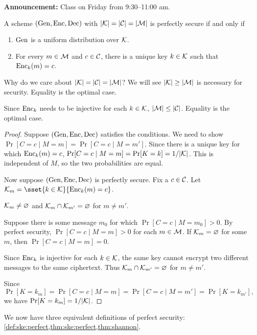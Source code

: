 \textbf{Announcement:} Class on Friday from 9:30--11:00 am.

\begin{theorem*} \label{thm:shannon}
    A scheme $(\operatorname{Gen}, \operatorname{Enc}, \operatorname{Dec})$ with
    $\lvert\mathcal{K}\rvert = \lvert\mathcal{C}\rvert = \lvert\mathcal{M}\rvert$ is perfectly secure
    if and only if
    \begin{enumerate}
        \item $\operatorname{Gen}$ is a uniform distribution over $\mathcal{K}$.
        \item For every $m \in \mathcal{M}$ and $c \in \mathcal{C}$,
            there is a unique key $k \in \mathcal{K}$ such that
            $\operatorname{Enc}_k(m) = c$.
    \end{enumerate}
\end{theorem*}
Why do we care about $\lvert\mathcal{K}\rvert = \lvert\mathcal{C}\rvert = \lvert\mathcal{M}\rvert$?
We will see $\lvert\mathcal{K}\rvert \ge \lvert\mathcal{M}\rvert$ is necessary for security.
Equality is the optimal case.

Since $\operatorname{Enc}_k$ needs to be injective for each $k \in \mathcal{K}$,
$\lvert\mathcal{M}\rvert \le \lvert\mathcal{C}\rvert$.
Equality is the optimal case.

\begin{proof}
    Suppose $(\operatorname{Gen}, \operatorname{Enc}, \operatorname{Dec})$ satisfies the conditions.
    We need to show $\Pr[C = c \mid M = m] = \Pr[C = c \mid M = m']$.
    Since there is a unique key for which $\operatorname{Enc}_k(m) = c$,
    $\Pr[C = c \mid M = m] = \Pr[K = k] = 1/\lvert\mathcal{K}\rvert$.
    This is independent of $M$, so the two probabilities are equal.

    Now suppose $(\operatorname{Gen}, \operatorname{Enc}, \operatorname{Dec})$ is perfectly secure.
    Fix a $c \in \mathcal{C}$.
    Let $\mcK_m = \sset{k \in \mcK}{\Enc_k(m) = c}$.

    \begin{claim}
        $\mathcal{K}_m \ne \varnothing$ and $\mathcal{K}_m \cap \mathcal{K}_{m'} = \varnothing$ for $m \ne m'$.
    \end{claim}
    Suppose there is some message $m_0$ for which
    $\Pr[C = c \mid M = m_0] > 0$.
    By perfect security, $\Pr[C = c \mid M = m] > 0$ for each $m \in \mathcal{M}$.
    If $\mathcal{K}_m = \varnothing$ for some $m$, then $\Pr[C = c \mid M = m] = 0$.

    Since $\operatorname{Enc}_k$ is injective for each $k \in \mathcal{K}$,
    the same key cannot encrypt two different messages to the same
    ciphertext.
    Thus $\mathcal{K}_m \cap \mathcal{K}_{m'} = \varnothing$ for $m \ne m'$.

    Since \[
        \Pr[K = k_m] = \Pr[C = c \mid M = m] = \Pr[C = c \mid M = m']
        = \Pr[K = k_{m'}],
    \] we have $\Pr[K = k_m] = 1/\lvert\mathcal{K}\rvert$.
\end{proof}

We now have three equivalent definitions of perfect security:
\cref{def:ske:perfect,thm:ske:perfect,thm:shannon}.
